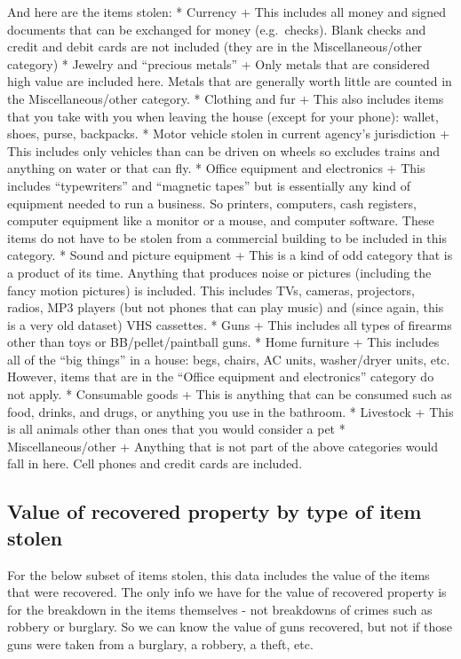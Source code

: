 \documentclass[
  12pt,
  openany]{book}
\begin{document}
And here are the items stolen:
* Currency
+ This includes all money and signed documents that can be exchanged for money (e.g.~checks). Blank checks and credit and debit cards are not included (they are in the Miscellaneous/other category)
* Jewelry and ``precious metals''
+ Only metals that are considered high value are included here. Metals that are generally worth little are counted in the Miscellaneous/other category.
* Clothing and fur
+ This also includes items that you take with you when leaving the house (except for your phone): wallet, shoes, purse, backpacks.
* Motor vehicle stolen in current agency's jurisdiction
+ This includes only vehicles than can be driven on wheels so excludes trains and anything on water or that can fly.
* Office equipment and electronics
+ This includes ``typewriters'' and ``magnetic tapes'' but is essentially any kind of equipment needed to run a business. So printers, computers, cash registers, computer equipment like a monitor or a mouse, and computer software. These items do not have to be stolen from a commercial building to be included in this category.
* Sound and picture equipment
+ This is a kind of odd category that is a product of its time. Anything that produces noise or pictures (including the fancy motion pictures) is included. This includes TVs, cameras, projectors, radios, MP3 players (but not phones that can play music) and (since again, this is a very old dataset) VHS cassettes.
* Guns
+ This includes all types of firearms other than toys or BB/pellet/paintball guns.
* Home furniture
+ This includes all of the ``big things'' in a house: begs, chairs, AC units, washer/dryer units, etc. However, items that are in the ``Office equipment and electronics'' category do not apply.
* Consumable goods
+ This is anything that can be consumed such as food, drinks, and drugs, or anything you use in the bathroom.
* Livestock
+ This is all animals other than ones that you would consider a pet
* Miscellaneous/other
+ Anything that is not part of the above categories would fall in here. Cell phones and credit cards are included.

\subsection{Value of recovered property by type of item stolen}\label{value-of-recovered-property-by-type-of-item-stolen}

For the below subset of items stolen, this data includes the value of the items that were recovered. The only info we have for the value of recovered property is for the breakdown in the items themselves - not breakdowns of crimes such as robbery or burglary. So we can know the value of guns recovered, but not if those guns were taken from a burglary, a robbery, a theft, etc.
\end{document}
